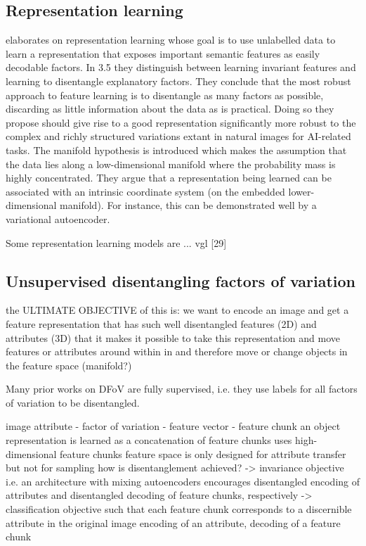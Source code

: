 \documentclass[11pt,a4paper]{article}
\begin{document}
\subsection{Representation learning}
\par\cite{1206.5538} elaborates on representation learning whose goal is to use unlabelled data to learn a representation that exposes important semantic features as easily decodable factors. In 3.5 they distinguish between learning invariant features and learning to disentangle explanatory factors. They conclude that the most robust approach to feature learning is to disentangle as many factors as possible, discarding as little information about the data as is practical. Doing so they propose should give rise to a good representation significantly more robust to the complex and richly structured variations extant in natural images for AI-related tasks. The manifold hypothesis is introduced which makes the assumption that the data lies along a low-dimensional manifold where the probability mass is highly concentrated. They argue that a representation being learned can be associated with an intrinsic coordinate system (on the embedded lower-dimensional manifold). For instance, this can be demonstrated well by a variational autoencoder.

Some representation learning models are ... vgl [29]

\subsection{Unsupervised disentangling factors of variation}
\par the ULTIMATE OBJECTIVE of this is: we want to encode an image and get a feature representation that has such well disentangled features (2D) and attributes (3D) that it makes it possible to take this representation and move features or attributes around within in and therefore move or change objects in the feature space (manifold?)

\par Many prior works on DFoV are fully supervised, i.e. they use labels for all factors of variation to be disentangled.

\par image attribute - factor of variation - feature vector - feature chunk
an object representation is learned as a concatenation of feature chunks
uses high-dimensional feature chunks
feature space is only designed for attribute transfer but not for sampling
how is disentanglement achieved? 
-> invariance objective i.e. an architecture with mixing autoencoders encourages disentangled encoding of attributes and disentangled decoding of feature chunks, respectively
-> classification objective such that each feature chunk corresponds to a discernible attribute in the original image 
encoding of an attribute, decoding of a feature chunk
\end{document}
